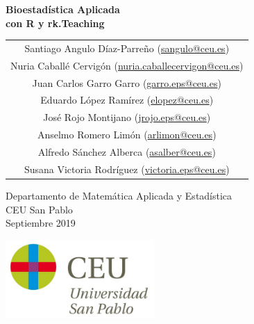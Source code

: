 \begin{titlepage}
\thispagestyle{empty}
\vspace*{7cm}
\par

\begin{center}
\normalfont\fontsize{30}{30}\selectfont
{\bfseries \color{blueceu}Bioestadística Aplicada\\ con R y rk.Teaching}
\end{center}
\vspace{1cm}

\begin{center}
\Large
\begin{tabular}{c}
Santiago Angulo Díaz-Parreño (\url{sangulo@ceu.es})\\
Nuria Caballé Cervigón (\url{nuria.caballecervigon@ceu.es})\\
Juan Carlos Garro Garro (\url{garro.eps@ceu.es})\\
Eduardo López Ramírez (\url{elopez@ceu.es})\\
José Rojo Montijano (\url{jrojo.eps@ceu.es})\\
Anselmo Romero Limón (\url{arlimon@ceu.es})\\
Alfredo Sánchez Alberca (\url{asalber@ceu.es})\\
Susana Victoria Rodríguez (\url{victoria.eps@ceu.es})
\end{tabular}

\medskip 
Departamento de Matemática Aplicada y Estadística\\ CEU San Pablo\\[1cm]
\medskip 
Septiembre 2019

\vspace{1cm}
\includegraphics[height=3cm]{img/logo_uspceu}
\end{center}
\vfill
\end{titlepage}